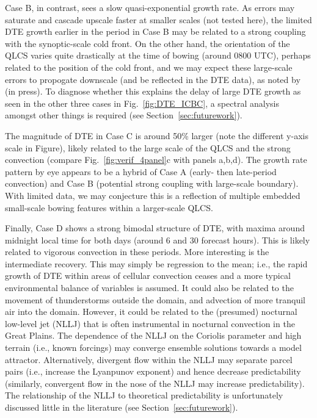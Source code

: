 \documentclass{ametsoc}
\begin{document}
Case B, in contrast, sees a slow quasi-exponential growth rate. As errors may saturate and cascade upscale faster at smaller scales (not tested here), the limited DTE growth earlier in the period in Case B may be related to a strong coupling with the synoptic-scale cold front. On the other hand, the orientation of the QLCS varies quite drastically at the time of bowing (around 0800 UTC), perhaps related to the position of the cold front, and we may expect these large-scale errors to propogate downscale (and be reflected in the DTE data), as noted by \citet{Durran_undated-qf} (in press). To diagnose whether this explains the delay of large DTE growth as seen in the other three cases in Fig.~\ref{fig:DTE_ICBC}, a spectral analysis amongst other things is required (see Section~\ref{sec:futurework}).

The magnitude of DTE in Case C is around 50\% larger (note the different y-axis scale in Figure), likely related to the large scale of the QLCS and the strong convection (compare Fig.~\ref{fig:verif_4panel}c with panels a,b,d). The growth rate pattern by eye appears to be a hybrid of Case A (early- then late-period convection) and Case B (potential strong coupling with large-scale boundary). With limited data, we may conjecture this is a reflection of multiple embedded small-scale bowing features within a larger-scale QLCS.

Finally, Case D shows a strong bimodal structure of DTE, with maxima around midnight local time for both days (around 6 and 30 forecast hours). This is likely related to vigorous convection in these periods. More interesting is the intermediate recovery. This may simply be regression to the mean; i.e., the rapid growth of DTE within areas of cellular convection ceases and a more typical environmental balance of variables is assumed. It could also be related to the movement of thunderstorms outside the domain, and advection of more tranquil air into the domain. However, it could be related to the (presumed) nocturnal low-level jet (NLLJ) that is often instrumental in nocturnal convection in the Great Plains. The dependence of the NLLJ on the Coriolis parameter and high terrain (i.e., known forcings) may converge ensemble solutions towards a model attractor. Alternatively, divergent flow within the NLLJ may separate parcel pairs (i.e., increase the Lyanpunov exponent) and hence decrease predictability (similarly, convergent flow in the nose of the NLLJ may increase predictability). The relationship of the NLLJ to theoretical predictability is unfortunately discussed little in the literature (see Section~\ref{sec:futurework}).
\end{document}
